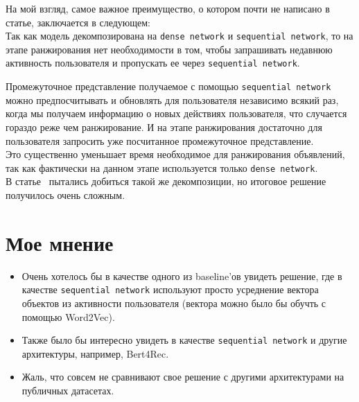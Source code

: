 На мой взгляд, самое важное преимущество, о котором почти не написано в статье, заключается в следующем: \\

Так как модель декомпозирована на \texttt{dense network} и \texttt{sequential network}, то на этапе ранжирования нет необходимости в том, чтобы запрашивать недавнюю активность пользователя и пропускать ее через \texttt{sequential network}. 

Промежуточное представление получаемое с помощью \texttt{sequential network} можно предпосчитывать и обновлять для пользователя независимо всякий раз, когда мы получаем информацию о новых действиях пользователя, что случается гораздо реже чем ранжирование. И на этапе ранжирования достаточно для пользователя запросить уже посчитанное промежуточное представление. \\

Это существенно уменьшает время необходимое для ранжирования объявлений, так как фактически на данном этапе используется только \texttt{dense network}. \\

В статье~\cite{pi2019practice} пытались добиться такой же декомпозиции, но итоговое решение получилось очень сложным.

\section*{Мое мнение}

\begin{itemize}
    \item Очень хотелось бы в качестве одного из baseline'ов увидеть решение, где в качестве \texttt{sequential network} используют просто усреднение вектора объектов из активности пользователя (вектора можно было бы обучть с помощью Word2Vec).
    \item Также было бы интересно увидеть в качестве \texttt{sequential network} и другие архитектуры, например, Bert4Rec.
    \item Жаль, что совсем не сравнивают свое решение с другими архитектурами на публичных датасетах.
\end{itemize}